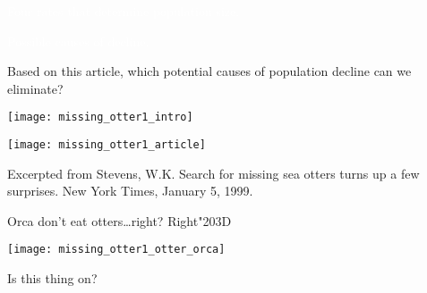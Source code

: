 \documentclass[t]{beamer}
\begin{document}
%
{
\begin{frame}{\phantom{phantom}}
	\begin{multicols}{2}
	
		\hangpara\textcolor{white}{Four rates that determine population size.}
	
	\columnbreak
	
		\hangpara\textcolor{white}{Possible causes of decline.}
	
	\end{multicols}
\end{frame}
}
%
\begin{frame}[t]
	\begin{multicols}{2}
	
		Based on this article, which potential causes 
		of population decline can we eliminate?
		
		\vspace*{0.65\baselineskip}
		
		\texttt{[image: missing\_otter1\_intro]}

	\columnbreak
	
		\texttt{[image: missing\_otter1\_article]}

	\end{multicols}
	
	\vfilll
	
	\tiny Excerpted from Stevens, W.K. Search for missing sea otters turns up a few surprises. New York Times, January 5, 1999.

\end{frame}
%
\begin{frame}[t]{Orca don't eat otters\dots right? \hfill Right\char"203D}

	\texttt{[image: missing\_otter1\_otter\_orca]}

	\vfilll
	
	\hfill \tiny Is this thing on?
\end{frame}
%
\end{document}
